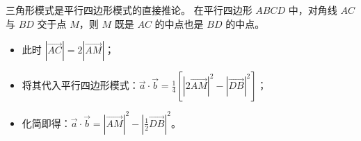 \begin{explanationbox}
三角形模式是平行四边形模式的直接推论。
在平行四边形 $ABCD$ 中，对角线 $AC$ 与 $BD$ 交于点 $M$，则 $M$ 既是 $AC$ 的中点也是 $BD$ 的中点。
\begin{itemize}
    \item 此时 $|\vec{AC}| = 2|\vec{AM}|$；
    \item 将其代入平行四边形模式：$\vec{a} \cdot \vec{b} = \frac{1}{4} [|2\vec{AM}|^2 - |\vec{DB}|^2]$；
    \item 化简即得：$\vec{a} \cdot \vec{b} = |\vec{AM}|^2 - |\frac{1}{2}\vec{DB}|^2$。
\end{itemize}
\end{explanationbox}